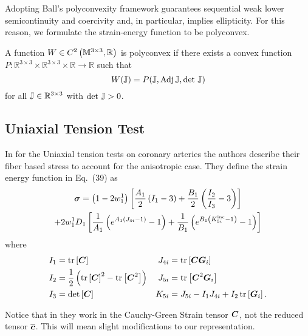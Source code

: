 \documentclass{article}
\begin{document}

Adopting Ball’s polyconvexity framework \cite{ball-1977} guarantees sequential weak lower semicontinuity and coercivity and, in particular, implies ellipticity. For this reason, we formulate the strain-energy function to be polyconvex.

\begin{definition}[Polyconvexity]
   A function $W\in C^2\left({\mathbb M}^{3\times 3}, {\mathbb R}\right)$ is polyconvex if there exists a convex function $P:\mathbb{R}^{3\times 3}\times\mathbb{R}^{3\times 3}\times\mathbb{R}\to\mathbb{R}$ such that
   \begin{equation}
      W({\mathbb J}) = P({\mathbb J}, \text{Adj}\,{\mathbb J}, \det\,{\mathbb J})
   \end{equation}
   for all ${\mathbb J}\in\mathbb{R}^{3\times 3}$ with $\det\,{\mathbb J} > 0$.
\end{definition}

\subsection{Uniaxial Tension Test}

In \cite[Sec.~4.1]{chaimoon2019} for the Uniaxial tension tests on coronary arteries the authors describe their fiber based stress to account for the anisotropic case.
They define the strain energy function in Eq.~(39) as
\begin{multline}
   \label{eqn:chaimoon-strain}
   {\boldsymbol \sigma} = \left(1-2w_1^1\right) \left[\frac{A_1}{2}\left(I_1-3\right) + \frac{B_1}{2}\left(\frac{I_2}{I_3}-3\right)\right] \\
   + 2w_1^1D_1 \left[\frac{1}{A_1}\left(e^{A_1\left(J_{4i}-1\right)}-1\right) + \frac{1}{B_1}\left(e^{B_1\left(K_{5i}^{\text{inc}}-1\right)} -1\right)\right]
\end{multline}
where
\begin{align*}
   I_1 &= \operatorname{tr}\left[{\boldsymbol C}\right] & J_{4i} &= \operatorname{tr}\left[{\boldsymbol C}{\boldsymbol G}_i\right] \\
   I_2 &= \frac{1}{2}\left(\operatorname{tr}\left[{\boldsymbol C}\right]^2 - \operatorname{tr}\left[{\boldsymbol C}^2\right]\right) & J_{5i} &= \operatorname{tr}\left[{\boldsymbol C}^2{\boldsymbol G}_i\right] \\
   I_3 &= \det\left[{\boldsymbol C}\right] & K_{5i} &= J_{5i} - I_1J_{4i} + I_2\operatorname{tr}\left[{\boldsymbol G}_i\right].
\end{align*}

\begin{remark}
   Notice that in \cite{chaimoon2019} they work in the Cauchy-Green Strain tensor ${\boldsymbol C}$, not the reduced tensor $\overline{{\boldsymbol c}}$.
   This will mean slight modifications to our representation.
\end{remark}
\end{document}
